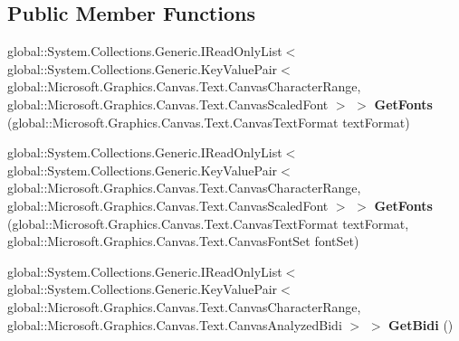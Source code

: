 \subsection*{Public Member Functions}
\begin{DoxyCompactItemize}
\item 
\mbox{\label{interface_microsoft_1_1_graphics_1_1_canvas_1_1_text_1_1_i_canvas_text_analyzer_aeef37c4db68a938f3d62ba8dbfaeed81}} 
global\+::\+System.\+Collections.\+Generic.\+I\+Read\+Only\+List$<$ global\+::\+System.\+Collections.\+Generic.\+Key\+Value\+Pair$<$ global\+::\+Microsoft.\+Graphics.\+Canvas.\+Text.\+Canvas\+Character\+Range, global\+::\+Microsoft.\+Graphics.\+Canvas.\+Text.\+Canvas\+Scaled\+Font $>$ $>$ {\bfseries Get\+Fonts} (global\+::\+Microsoft.\+Graphics.\+Canvas.\+Text.\+Canvas\+Text\+Format text\+Format)
\item 
\mbox{\label{interface_microsoft_1_1_graphics_1_1_canvas_1_1_text_1_1_i_canvas_text_analyzer_afe87e79f1d9d43241df23f2f1835733d}} 
global\+::\+System.\+Collections.\+Generic.\+I\+Read\+Only\+List$<$ global\+::\+System.\+Collections.\+Generic.\+Key\+Value\+Pair$<$ global\+::\+Microsoft.\+Graphics.\+Canvas.\+Text.\+Canvas\+Character\+Range, global\+::\+Microsoft.\+Graphics.\+Canvas.\+Text.\+Canvas\+Scaled\+Font $>$ $>$ {\bfseries Get\+Fonts} (global\+::\+Microsoft.\+Graphics.\+Canvas.\+Text.\+Canvas\+Text\+Format text\+Format, global\+::\+Microsoft.\+Graphics.\+Canvas.\+Text.\+Canvas\+Font\+Set font\+Set)
\item 
\mbox{\label{interface_microsoft_1_1_graphics_1_1_canvas_1_1_text_1_1_i_canvas_text_analyzer_ab5391603e9550535647efdab365121e0}} 
global\+::\+System.\+Collections.\+Generic.\+I\+Read\+Only\+List$<$ global\+::\+System.\+Collections.\+Generic.\+Key\+Value\+Pair$<$ global\+::\+Microsoft.\+Graphics.\+Canvas.\+Text.\+Canvas\+Character\+Range, global\+::\+Microsoft.\+Graphics.\+Canvas.\+Text.\+Canvas\+Analyzed\+Bidi $>$ $>$ {\bfseries Get\+Bidi} ()
\item 
\mbox{\label{interface_microsoft_1_1_graphics_1_1_canvas_1_1_text_1_1_i_canvas_text_analyzer_a00b2a6c66d95fcf0eb8cb93429692433}} 

\end{DoxyCompactItemize}
